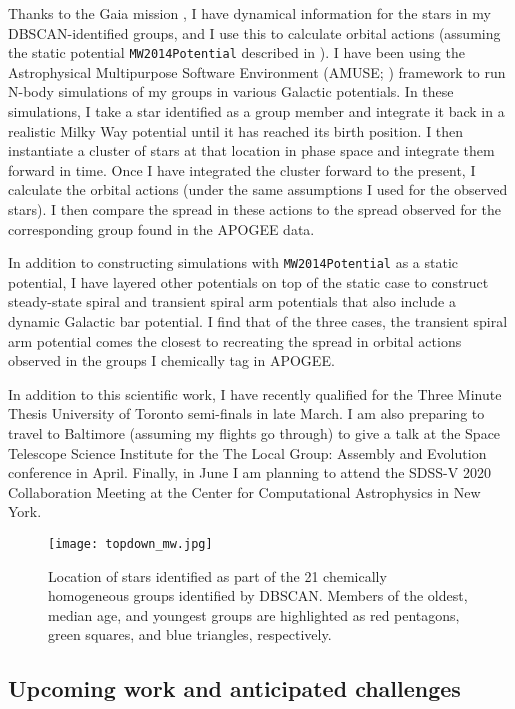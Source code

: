 \documentclass[11pt]{article}
\begin{document}
    Thanks to the Gaia mission \citep{GaiaCollaboration2016, GaiaCollaboration2018}, I have dynamical information for the stars in my DBSCAN-identified groups, and I use this to calculate orbital actions (assuming the static potential \texttt{MW2014Potential} described in \citealt{Bovy2015}). I have been using the Astrophysical Multipurpose Software Environment (AMUSE; \citealt{Portegies2013, Pelupessy2013, Portegies2018}) framework to run N-body simulations of my groups in various Galactic potentials. In these simulations, I take a star identified as a group member and integrate it back in a realistic Milky Way potential until it has reached its birth position. I then instantiate a cluster of stars at that location in phase space and integrate them forward in time. Once I have integrated the cluster forward to the present, I calculate the orbital actions (under the same assumptions I used for the observed stars). I then compare the spread in these actions to the spread observed for the corresponding group found in the APOGEE data. 
    
    In addition to constructing simulations with \texttt{MW2014Potential} as a static potential, I have layered other potentials on top of the static case to construct steady-state spiral and transient spiral arm potentials that also include a dynamic Galactic bar potential. I find that of the three cases, the transient spiral arm potential comes the closest to recreating the spread in orbital actions observed in the groups I chemically tag in APOGEE.

	In addition to this scientific work, I have recently qualified for the Three Minute Thesis University of Toronto semi-finals in late March. I am also preparing to travel to Baltimore (assuming my flights go through) to give a talk at the Space Telescope Science Institute for the The Local Group: Assembly and Evolution conference in April. Finally, in June I am planning to attend the SDSS-V 2020 Collaboration Meeting at the Center for Computational Astrophysics in New York.
	
\begin{figure}[h]
\centering
\texttt{[image: topdown\_mw.jpg]}
\caption{Location of stars identified as part of the 21 chemically homogeneous groups identified by DBSCAN. Members of the oldest, median age, and youngest groups are highlighted as red pentagons, green squares, and blue triangles, respectively.}
\label{fig:mw}
\end{figure}

    
    \subsection*{Upcoming work and anticipated challenges}
    
\end{document}
